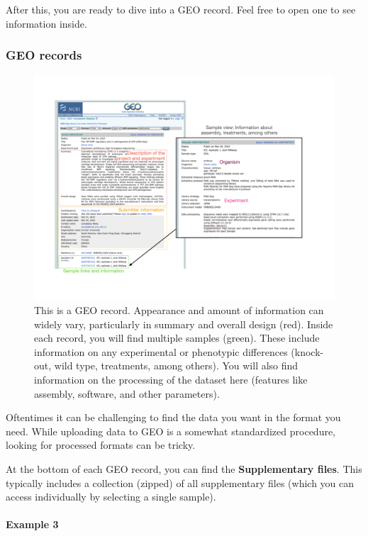 \documentclass[
]{book}
\begin{document}
After this, you are ready to dive into a GEO record. Feel free to open one to see information inside.

\hypertarget{geo-records}{%
\subsubsection{GEO records}\label{geo-records}}

\begin{figure}
\centering
\includegraphics{figures/GEOrecord.png}
\caption{This is a GEO record. Appearance and amount of information can widely vary, particularly in summary and overall design (red). Inside each record, you will find multiple samples (green). These include information on any experimental or phenotypic differences (knock-out, wild type, treatments, among others). You will also find information on the processing of the dataset here (features like assembly, software, and other parameters).}
\end{figure}

Oftentimes it can be challenging to find the data you want in the format you need. While uploading data to GEO is a somewhat standardized procedure, looking for processed formats can be tricky.

At the bottom of each GEO record, you can find the \textbf{Supplementary files}. This typically includes a collection (zipped) of all supplementary files (which you can access individually by selecting a single sample).

\hypertarget{example-3}{%
\paragraph{Example 3}\label{example-3}}
\end{document}
